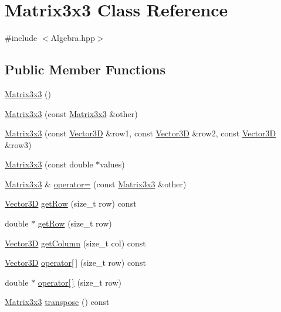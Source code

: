 \hypertarget{class_matrix3x3}{\section{Matrix3x3 Class Reference}
\label{class_matrix3x3}
}


{\ttfamily \#include $<$Algebra.\-hpp$>$}

\subsection*{Public Member Functions}
\begin{DoxyCompactItemize}
\item 
\hyperlink{class_matrix3x3_ac6b901793405c0f36f65d6c4a624d0e7}{Matrix3x3} ()
\item 
\hyperlink{class_matrix3x3_abe38083cf46bb1f783ff64917a9e5404}{Matrix3x3} (const \hyperlink{class_matrix3x3}{Matrix3x3} \&other)
\item 
\hyperlink{class_matrix3x3_a4830a1913f2aa6f9c38281062aaed303}{Matrix3x3} (const \hyperlink{class_vector3_d}{Vector3\-D} \&row1, const \hyperlink{class_vector3_d}{Vector3\-D} \&row2, const \hyperlink{class_vector3_d}{Vector3\-D} \&row3)
\item 
\hyperlink{class_matrix3x3_a77720ea70bf2bb1fae52667aeb3bf419}{Matrix3x3} (const double $\ast$values)
\item 
\hyperlink{class_matrix3x3}{Matrix3x3} \& \hyperlink{class_matrix3x3_ab91b7dc85335166bdc20b77b8f9c34e9}{operator=} (const \hyperlink{class_matrix3x3}{Matrix3x3} \&other)
\item 
\hyperlink{class_vector3_d}{Vector3\-D} \hyperlink{class_matrix3x3_a04888194a52b970549b5fbe40c5a80b3}{get\-Row} (size\-\_\-t row) const 
\item 
double $\ast$ \hyperlink{class_matrix3x3_a9e55dda2c3616c79254429ffbcecc6d4}{get\-Row} (size\-\_\-t row)
\item 
\hyperlink{class_vector3_d}{Vector3\-D} \hyperlink{class_matrix3x3_a3243d4730e65222094e8e7589ded5162}{get\-Column} (size\-\_\-t col) const 
\item 
\hyperlink{class_vector3_d}{Vector3\-D} \hyperlink{class_matrix3x3_a37f611d52839c3790c1983dced8cbf56}{operator\mbox{[}$\,$\mbox{]}} (size\-\_\-t row) const 
\item 
double $\ast$ \hyperlink{class_matrix3x3_a96590caac1fd0d0ba1c344b5cced47eb}{operator\mbox{[}$\,$\mbox{]}} (size\-\_\-t row)
\item 
\hyperlink{class_matrix3x3}{Matrix3x3} \hyperlink{class_matrix3x3_a6d2a2b5c4d1876a72aeada3879dc507b}{transpose} () const 

\end{DoxyCompactItemize}
